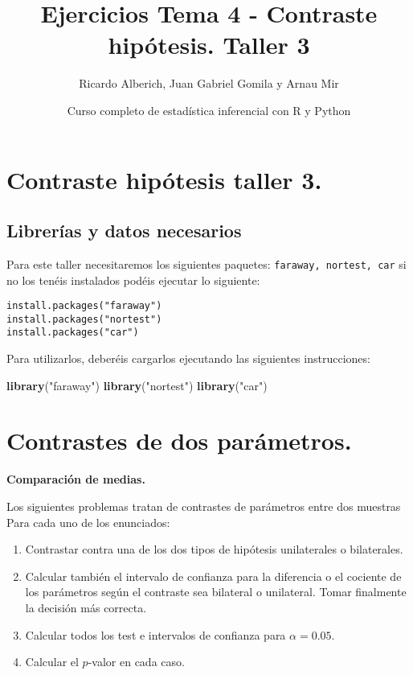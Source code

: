 \documentclass[
]{article}
\title{Ejercicios Tema 4 - Contraste hipótesis. Taller 3}
\author{Ricardo Alberich, Juan Gabriel Gomila y Arnau Mir}
\date{Curso completo de estadística inferencial con R y Python}
\newenvironment{Shaded}{\begin{snugshade}}{\end{snugshade}}
\newcommand{\KeywordTok}[1]{\textcolor[rgb]{0.13,0.29,0.53}{\textbf{#1}}}
\newcommand{\NormalTok}[1]{#1}
\newcommand{\StringTok}[1]{\textcolor[rgb]{0.31,0.60,0.02}{#1}}
\providecommand{\tightlist}{%
  \setlength{\itemsep}{0pt}\setlength{\parskip}{0pt}}
\begin{document}
\maketitle

{
\hypersetup{linkcolor=blue}
\setcounter{tocdepth}{2}
\tableofcontents
}
\hypertarget{contraste-hipuxf3tesis-taller-3.}{%
\section{Contraste hipótesis taller
3.}\label{contraste-hipuxf3tesis-taller-3.}}

\hypertarget{libreruxedas-y-datos-necesarios}{%
\subsection{Librerías y datos
necesarios}\label{libreruxedas-y-datos-necesarios}}

Para este taller necesitaremos los siguientes paquetes:
\texttt{faraway,\ nortest,\ car} si no los tenéis instalados podéis
ejecutar lo siguiente:

\begin{verbatim}
install.packages("faraway")
install.packages("nortest")
install.packages("car")
\end{verbatim}

Para utilizarlos, deberéis cargarlos ejecutando las siguientes
instrucciones:

\begin{Shaded}
\begin{Highlighting}[]
\KeywordTok{library}\NormalTok{(}\StringTok{"faraway"}\NormalTok{)}
\KeywordTok{library}\NormalTok{(}\StringTok{"nortest"}\NormalTok{)}
\KeywordTok{library}\NormalTok{(}\StringTok{"car"}\NormalTok{)}
\end{Highlighting}
\end{Shaded}

\hypertarget{contrastes-de-dos-paruxe1metros.}{%
\section{Contrastes de dos
parámetros.}\label{contrastes-de-dos-paruxe1metros.}}

\textbf{Comparación de medias.}

Los siguientes problemas tratan de contrastes de parámetros entre dos
muestras Para cada uno de los enunciados:

\begin{enumerate}
\def\labelenumi{\arabic{enumi}.}
\tightlist
\item
  Contrastar contra una de los dos tipos de hipótesis unilaterales o
  bilaterales.
\item
  Calcular también el intervalo de confianza para la diferencia o el
  cociente de los parámetros según el contraste sea bilateral o
  unilateral. Tomar finalmente la decisión más correcta.
\item
  Calcular todos los test e intervalos de confianza para
  \(\alpha=0.05\).
\item
  Calcular el \(p\)-valor en cada caso.
\end{enumerate}
\end{document}
